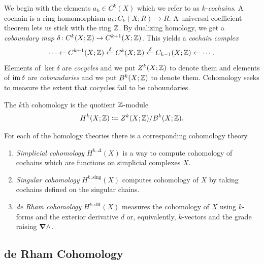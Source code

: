 \documentclass{article}
\begin{document}
We begin with the elements $a_k \in C^k(X)$ which we refer to as \emph{$k$-cochains}. A cochain is a ring homomorphism $a_k \colon C_k(X;R) \to R$. A universal coefficient theorem lets us stick with the ring $\mathbb{Z}$. By dualizing homology, we get a \emph{coboundary map} $\delta \colon C^k(X;\mathbb{Z}) \to C^{k+1}(X;\mathbb{Z})$. This yields a \emph{cochain complex}
\begin{equation}
\cdots \xleftarrow{} C^{k+1}(X;\mathbb{Z}) \xleftarrow{\delta} C^k(X;\mathbb{Z}) \xleftarrow{\delta} C_{k-1}(X;\mathbb{Z}) \xleftarrow{} \cdots.
\end{equation}
Elements of $\ker \delta$ are \emph{cocycles} and we put $Z^k(X;\mathbb{Z})$ to denote them and elements of $\operatorname{im} \delta$ are \emph{coboundaries} and we put $B^k(X;\mathbb{Z})$ to denote them. Cohomology seeks to measure the extent that cocycles fail to be coboundaries.
\begin{definition}
The $k$th cohomology is the quotient $\mathbb{Z}$-module
\begin{equation}
    H^k(X;\mathbb{Z}) \coloneqq Z^k(X;\mathbb{Z})/B^k(X;\mathbb{Z}).
\end{equation}
\end{definition}
For each of the homology theories there is a corresponding cohomology theory.
\begin{enumerate}
    \item \emph{Simplicial cohomology} $H^{k,\Delta}(X)$ is a way to compute cohomology of cochains which are functions on simplicial complexes $X$. 
    \item \emph{Singular cohomology} $H^{k,\textrm{sing}}(X)$ computes cohomology of $X$ by taking cochains defined on the singular chains.
    \item \emph{de Rham cohomology} $H^{k,\textrm{dR}}(X)$ measures the cohomology of $X$ using $k$-forms and the exterior derivative $d$ or, equivalently, $k$-vectors and the grade raising $\boldsymbol{\nabla} \wedge$.
\end{enumerate}

\subsection{de Rham Cohomology}
\end{document}
